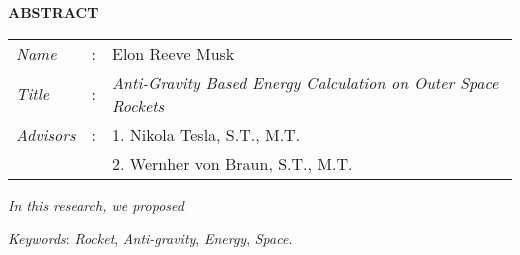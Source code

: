 \begin{center}
  \large\textbf{ABSTRACT}
\end{center}

\vspace{2ex}

\begingroup
  \setlength{\tabcolsep}{0pt}

  \noindent
  \begin{tabularx}{\textwidth}{l >{\centering}m{3em} X}
    \emph{Name}     &:& Elon Reeve Musk \\

    \emph{Title}    &:& \emph{Anti-Gravity Based Energy Calculation on Outer Space Rockets} \\

    \emph{Advisors} &:& 1. Nikola Tesla, S.T., M.T. \\
                    & & 2. Wernher von Braun, S.T., M.T. \\
  \end{tabularx}
\endgroup

\emph{In this research, we proposed \lipsum[1]}

\emph{Keywords}: \emph{Rocket}, \emph{Anti-gravity}, \emph{Energy}, \emph{Space}.
